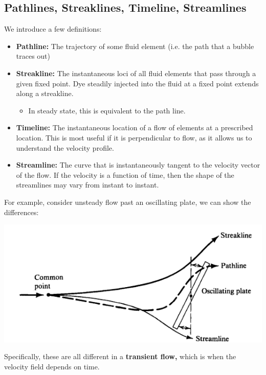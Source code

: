 \documentclass{article}
\begin{document}
\subsection{Pathlines, Streaklines, Timeline, Streamlines}
We introduce a few definitions: 
\begin{itemize}
    \item \textbf{Pathline:} The trajectory of some fluid element (i.e. the path that a bubble traces out)
    \item \textbf{Streakline:} The instantaneous loci of all fluid elements that pass through a given fixed point. Dye steadily injected into the fluid at a fixed point extends along a streakline.
    \begin{itemize}
        \item In steady state, this is equivalent to the path line.
    \end{itemize}
    \item \textbf{Timeline:} The instantaneous location of a flow of elements at a prescribed location. This is most useful if it is perpendicular to flow, as it allows us to understand the velocity profile.
    \item \textbf{Streamline:} The curve that is instantaneously tangent to the velocity vector of the flow. If the velocity is a function of time, then the shape of the streamlines may vary from instant to instant.
\end{itemize}
For example, consider unsteady flow past an oscillating plate, we can show the differences: 
\begin{center}
    \includegraphics[width=0.5\linewidth]{lines.png}
\end{center}
Specifically, these are all different in a \textbf{transient flow,} which is when the velocity field depends on time. 
\end{document}
